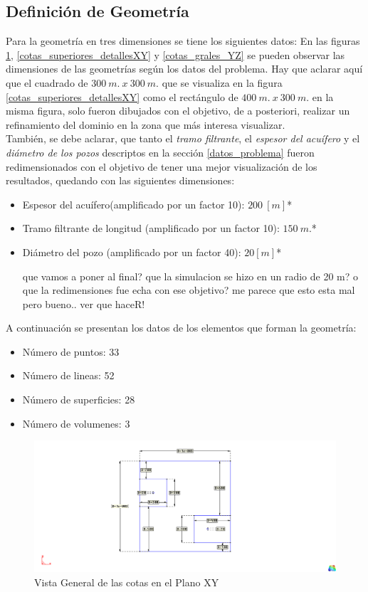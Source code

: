 \documentclass[10pt,a4paper,final]{article}
\begin{document}
\subsection{Definición de Geometría}
Para la geometría en tres dimensiones se tiene los siguientes datos:
En las figuras \ref{cotas_superiores_generalesXY}, \ref{cotas_superiores_detallesXY} y \ref{cotas_grales_YZ} se pueden observar
las dimensiones de las geometrías según los datos del problema. Hay que aclarar aquí que el cuadrado de $300~m.~x~300~m.$ que se visualiza
en la figura \ref{cotas_superiores_detallesXY} como el rectángulo de $400~m.~x~300~m.$ en la misma figura, solo fueron dibujados con el
objetivo, de a posteriori, realizar un refinamiento del dominio en la zona que más interesa visualizar.\\
También, se debe aclarar, que tanto el \emph{tramo filtrante}, el \emph{espesor del acuífero} y el \emph{diámetro de los pozos} descriptos en la sección \ref{datos_problema} fueron redimensionados con el objetivo de tener una  mejor visualización de los resultados, quedando con las siguientes dimensiones:
\begin{itemize}
		\item Espesor del acuífero(amplificado por un factor 10): $200 ~\left[m\right]$*
		\item Tramo filtrante de longitud (amplificado por un factor 10): $150~m.$*
		\item Diámetro del pozo (amplificado por un factor 40): $20 [m]$*
		\begin{Large}
		que vamos a poner al final? que la simulacion se hizo en un radio de 20 m? o que la redimensiones fue echa con ese objetivo? me parece que esto esta mal pero bueno.. ver que haceR!
		\end{Large}
\end{itemize}
A continuación se presentan los datos de los elementos que forman la geometría:
\begin{itemize}
\item Número de puntos: 33
\item Número de lineas: 52
\item Número de superficies: 28
\item Número de volumenes: 3
\end{itemize}

\begin{figure}[tbhp]
\centerline{\includegraphics[scale=0.75]{img/cotas_superiores_generalesXY}}
\caption{Vista General de las cotas en el Plano XY}
\label{cotas_superiores_generalesXY}
\end{figure}
\end{document}
